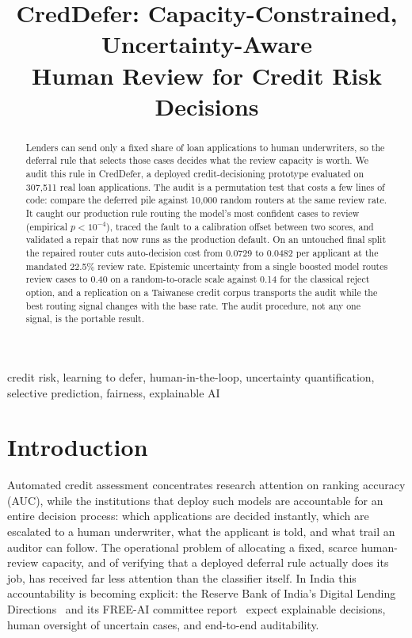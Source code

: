 \documentclass[conference]{IEEEtran}
\title{CredDefer: Capacity-Constrained, Uncertainty-Aware\\
Human Review for Credit Risk Decisions}
\author{
\IEEEauthorblockN{Shreyash Thakur, Shweta Karandikar, Yuvaan Shah, Bhakti Palkar}
\IEEEauthorblockA{Department of Computer Engineering\\
K. J. Somaiya College of Engineering, Mumbai, India\\
Email: \{shreyash.thakur, s.karandikar, yuvaan.shah, bhaktiraul\}@somaiya.edu}
}
\begin{document}
\maketitle

\begin{abstract}
Lenders can send only a fixed share of loan applications to human
underwriters, so the deferral rule that selects those cases decides what the
review capacity is worth. We audit this rule in CredDefer, a deployed
credit-decisioning prototype evaluated on 307{,}511 real loan applications.
The audit is a permutation test that costs a few lines of code: compare the
deferred pile against 10{,}000 random routers at the same review rate. It
caught our production rule routing the model's most confident cases to
review (empirical $p < 10^{-4}$), traced the fault to a calibration offset
between two scores, and validated a repair that now runs as the production
default. On an untouched final split the repaired router cuts auto-decision
cost from 0.0729 to 0.0482 per applicant at the mandated 22.5\% review rate.
Epistemic uncertainty from a single boosted model routes review cases to
0.40 on a random-to-oracle scale against 0.14 for the classical reject
option, and a replication on a Taiwanese credit corpus transports the audit
while the best routing signal changes with the base rate. The audit
procedure, not any one signal, is the portable result.
\end{abstract}

\begin{IEEEkeywords}
credit risk, learning to defer, human-in-the-loop, uncertainty quantification,
selective prediction, fairness, explainable AI
\end{IEEEkeywords}

\section{Introduction}
Automated credit assessment concentrates research attention on ranking
accuracy (AUC), while the institutions that deploy such models are
accountable for an entire decision process: which applications are decided
instantly, which are escalated to a human underwriter, what the applicant is
told, and what trail an auditor can follow. The operational problem of
allocating a fixed, scarce human-review capacity, and of verifying that a
deployed deferral rule actually does its job, has received far less
attention than the classifier itself. In India this accountability is
becoming explicit: the Reserve Bank of India's Digital Lending
Directions~\cite{rbi2025} and its FREE-AI committee report~\cite{rbifreeai}
expect explainable decisions, human oversight of uncertain cases, and
end-to-end auditability.
\end{document}
